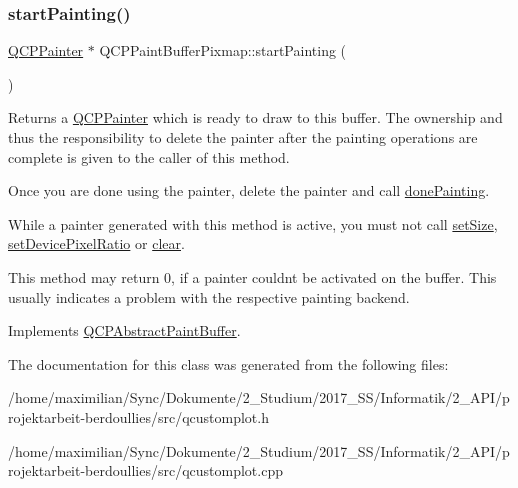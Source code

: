 \subsubsection{\texorpdfstring{start\+Painting()}{startPainting()}}
{\footnotesize\ttfamily \hyperlink{class_q_c_p_painter}{Q\+C\+P\+Painter} $\ast$ Q\+C\+P\+Paint\+Buffer\+Pixmap\+::start\+Painting (\begin{DoxyParamCaption}{ }\end{DoxyParamCaption})\hspace{0.3cm}{\ttfamily [virtual]}}

Returns a \hyperlink{class_q_c_p_painter}{Q\+C\+P\+Painter} which is ready to draw to this buffer. The ownership and thus the responsibility to delete the painter after the painting operations are complete is given to the caller of this method.

Once you are done using the painter, delete the painter and call \hyperlink{class_q_c_p_abstract_paint_buffer_a41b0dc6e7744f19fae09f8532c207dc1}{done\+Painting}.

While a painter generated with this method is active, you must not call \hyperlink{class_q_c_p_abstract_paint_buffer_a8b68c3cd36533f1a4a23b5ce8cd66f01}{set\+Size}, \hyperlink{class_q_c_p_abstract_paint_buffer_a555eaad5d5c806420ff35602a1bb68fa}{set\+Device\+Pixel\+Ratio} or \hyperlink{class_q_c_p_paint_buffer_pixmap_a14badbd010a3cde6b55817ccb7b65217}{clear}.

This method may return 0, if a painter couldn\textquotesingle{}t be activated on the buffer. This usually indicates a problem with the respective painting backend. 

Implements \hyperlink{class_q_c_p_abstract_paint_buffer_a9e9f29b19c033cf02fb96f1a148463f3}{Q\+C\+P\+Abstract\+Paint\+Buffer}.



The documentation for this class was generated from the following files\+:\begin{DoxyCompactItemize}
\item 
/home/maximilian/\+Sync/\+Dokumente/2\+\_\+\+Studium/2017\+\_\+\+S\+S/\+Informatik/2\+\_\+\+A\+P\+I/projektarbeit-\/berdoullies/src/qcustomplot.\+h\item 
/home/maximilian/\+Sync/\+Dokumente/2\+\_\+\+Studium/2017\+\_\+\+S\+S/\+Informatik/2\+\_\+\+A\+P\+I/projektarbeit-\/berdoullies/src/qcustomplot.\+cpp\end{DoxyCompactItemize}
